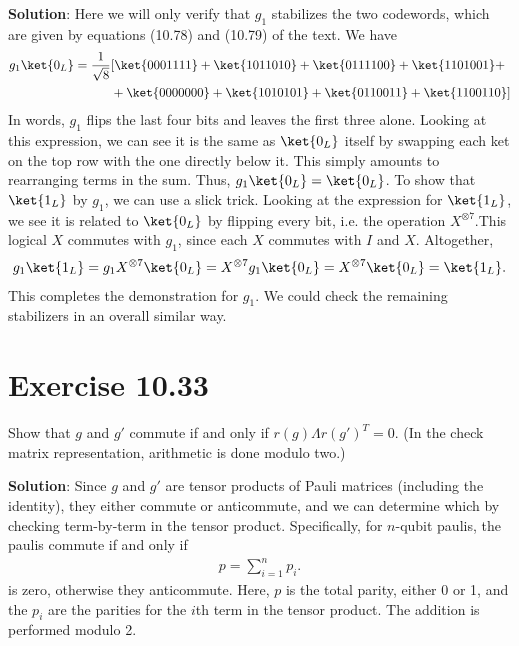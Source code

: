 \documentclass{book}
\begin{document}
    \textbf{Solution}: Here we will only verify that $g_1$ stabilizes the two codewords, which are given by equations (10.78) and (10.79) of the text. We have
    \begin{align}
    \begin{aligned}
        g_1\ket{0_L} = \frac{1}{\sqrt{8}}&[\ket{0001111}+\ket{1011010}+\ket{0111100}+\ket{1101001} + \\
        &+\ket{0000000}+\ket{1010101}+\ket{0110011}+\ket{1100110}] \\
    \end{aligned}
    \end{align}
    In words, $g_1$ flips the last four bits and leaves the first three alone. Looking at this expression, we can see it is the same as $\ket{0_L}$ itself by swapping each ket on the top row with the one directly below it. This simply amounts to rearranging terms in the sum. Thus, $g_1\ket{0_L} = \ket{0_L}$. To show that $\ket{1_L}$ by $g_1$, we can use a slick trick. Looking at the expression for $\ket{1_L}$, we see it is related to $\ket{0_L}$ by flipping every bit, i.e. the operation $X^{\otimes 7}$.This logical $X$ commutes with $g_1$, since each $X$ commutes with $I$ and $X$. Altogether,
    \begin{align}
        g_1\ket{1_L} = g_1 X^{\otimes 7}\ket{0_L} = X^{\otimes 7} g_1 \ket{0_L} = X^{\otimes 7} \ket{0_L} = \ket{1_L}.
    \end{align}
    This completes the demonstration for $g_1$. We could check the remaining stabilizers in an overall similar way.
    
\section*{Exercise 10.33}
    Show that $g$ and $g'$ commute if and only if $r(g) \Lambda r(g')^T = 0$. (In the check matrix representation, arithmetic is done modulo two.)
    
    \textbf{Solution}: Since $g$ and $g'$ are tensor products of Pauli matrices (including the identity), they either commute or anticommute, and we can determine which by checking term-by-term in the tensor product. Specifically, for $n$-qubit paulis, the paulis commute if and only if
    \begin{align}
        p = \sum_{i=1}^n p_i.
    \end{align}
    is zero, otherwise they anticommute. Here, $p$ is the total parity, either 0 or 1, and the $p_i$ are the parities for the $i$th term in the tensor product. The addition is performed modulo 2.
\end{document}
